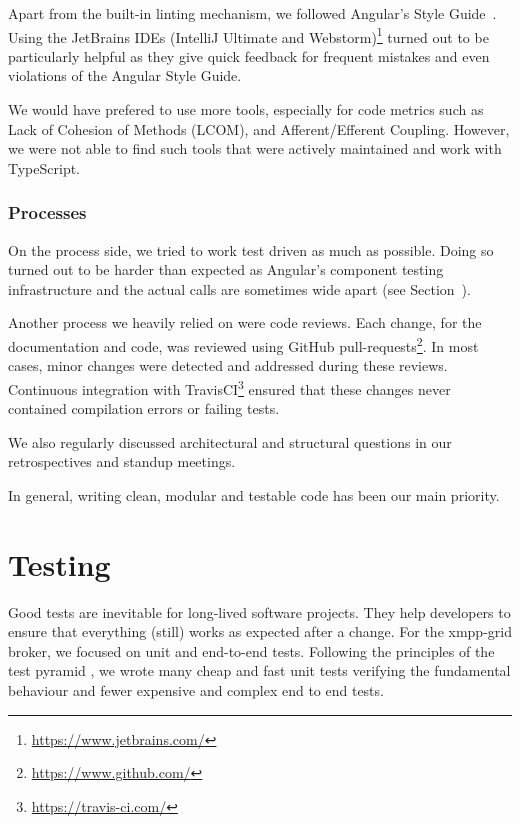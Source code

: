Apart from the built-in linting mechanism, we followed Angular's Style Guide~\cite{angular-style-guide}.
Using the JetBrains IDEs (IntelliJ Ultimate and Webstorm)\footnote{\url{https://www.jetbrains.com/}} turned out to be particularly helpful as they give quick feedback for frequent mistakes and even violations of the Angular Style Guide.

We would have prefered to use more tools, especially for code metrics such as Lack of Cohesion of Methods (LCOM), and Afferent/Efferent Coupling.
However, we were not able to find such tools that were actively maintained and work with TypeScript.

\subsubsection{Processes}

On the process side, we tried to work test driven as much as possible.
Doing so turned out to be harder than expected as Angular's component testing infrastructure and the actual calls are sometimes wide apart (see Section~).

Another process we heavily relied on were code reviews.
Each change, for the documentation and code, was reviewed using GitHub pull-requests\footnote{\url{https://www.github.com/}}.
In most cases, minor changes were detected and addressed during these reviews.
Continuous integration with TravisCI\footnote{\url{https://travis-ci.com/}} ensured that these changes never contained compilation errors or failing tests.

We also regularly discussed architectural and structural questions in our retrospectives and standup meetings.

In general, writing clean, modular and testable code has been our main priority.

\section{Testing}\label{sec:testing}

Good tests are inevitable for long-lived software projects.
They help developers to ensure that everything (still) works as expected after a change.
For the \gls{xmpp-grid} \gls{broker}, we focused on unit and end-to-end tests.
Following the principles of the test pyramid \cite{Cohn:2009:SAS:1667109}, we wrote many cheap and fast unit tests verifying the fundamental behaviour and fewer expensive and complex end to end tests.


